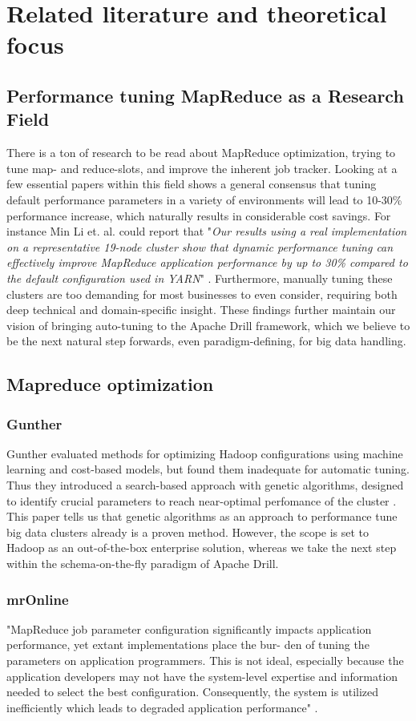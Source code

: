 \documentclass[a4paper,english]{report}
\begin{document}
	\section{Related literature and theoretical focus}
		\subsection{Performance tuning MapReduce as a Research Field}
		There is a ton of research to be read about MapReduce optimization, trying to tune map- and reduce-slots, and improve the inherent job tracker. Looking at a few essential papers within this field shows a general consensus that tuning default performance parameters in a variety of environments will lead to 10-30\% performance increase, which naturally results in considerable cost savings. For instance Min Li et. al. could report that "\textit{Our results using a real implementation on a representative 19-node cluster show that dynamic performance tuning can effectively improve MapReduce application performance by up to 30\% compared to the default configuration used in YARN}" \cite{mronline}. Furthermore, manually tuning these clusters are too demanding for most businesses to even consider, requiring both deep technical and domain-specific insight. These findings further maintain our vision of bringing auto-tuning to the Apache Drill framework, which we believe to be the next natural step forwards, even paradigm-defining, for big data handling.
	
		\subsection{Mapreduce optimization}
			\subsubsection{Gunther}
			Gunther evaluated methods for optimizing Hadoop configurations using machine learning and cost-based models, but found them inadequate for automatic tuning. Thus they introduced a search-based approach with genetic algorithms, designed to identify crucial parameters to reach near-optimal perfomance of the cluster \cite{gunther}. This paper tells us that genetic algorithms as an approach to performance tune big data clusters already is a proven method. However, the scope is set to Hadoop as an out-of-the-box enterprise solution, whereas we take the next step within the schema-on-the-fly paradigm of Apache Drill.
			
			\subsubsection{mrOnline}
			"MapReduce job parameter configuration significantly impacts
			application performance, yet extant implementations place the bur-
			den of tuning the parameters on application programmers. This is
			not ideal, especially because the application developers may not
			have the system-level expertise and information needed to select
			the best configuration. Consequently, the system is utilized inefficiently which leads to degraded application performance" \cite{mronline}.
			
\end{document}
